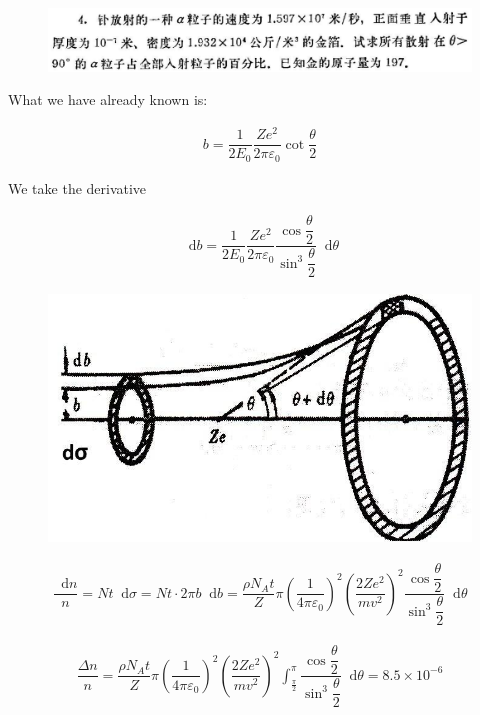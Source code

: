 \documentclass{article}
\newcommand*{\md}{\mathop{}\!\mathrm{d}}
\begin{document}
\begin{figure}[H]
  \centering
  \includegraphics[width=\linewidth]{figures/Problem4}
  \label{fig:}
\end{figure}

What we have already known is:

\begin{equation*}
  \begin{aligned}
    b = \dfrac{1}{2 E_0}  \dfrac{Z e^2}{2 \pi \varepsilon_0} \cot \dfrac{\theta}{2}
  \end{aligned}
\end{equation*}

We take the derivative

\begin{equation*}
  \begin{aligned}
    \md b = \dfrac{1}{2 E_0}  \dfrac{Z e^2}{2 \pi \varepsilon_0} \dfrac{\cos \dfrac{\theta}{2} }{\sin^3 \dfrac{\theta}{2} } \md \theta
  \end{aligned}
\end{equation*}

\begin{figure}[H]
  \centering
  \includegraphics[width=0.5\linewidth]{figures/Rutherford-1}
  \label{fig:}
\end{figure}

\begin{equation*}
  \begin{aligned}
    \dfrac{\md n}{n} = N t \md \sigma = N t \cdot 2 \pi b \md b = \dfrac{\rho N_A t}{Z} \pi \left( \dfrac{1}{4 \pi \varepsilon_0}  \right)^2 \left( \dfrac{2 Z e^2}{m v^2}  \right)^2 \dfrac{\cos \dfrac{\theta}{2} }{\sin^3 \dfrac{\theta}{2} } \md \theta
  \end{aligned}
\end{equation*}

\begin{equation*}
  \begin{aligned}
    \dfrac{\Delta n}{n} =  \dfrac{\rho N_A t}{Z} \pi \left( \dfrac{1}{4 \pi \varepsilon_0}  \right)^2 \left( \dfrac{2 Z e^2}{m v^2}  \right)^2 \int_{\frac{\pi}{2} }^{\pi} \dfrac{\cos \dfrac{\theta}{2} }{\sin^3 \dfrac{\theta}{2} } \md \theta = 8.5 \times 10^{-6}
  \end{aligned}
\end{equation*}
\end{document}

